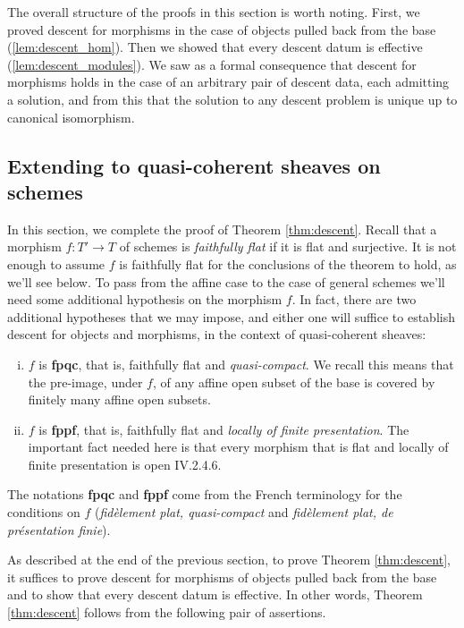 \documentclass[12pt]{article}
\begin{document}
\begin{remark}
    The overall structure of the proofs in this section is worth noting. First, we proved descent for morphisms in the case of objects pulled back from the base (\ref{lem:descent_hom}). Then we showed that
every descent datum is effective (\ref{lem:descent_modules}). We saw as a formal consequence that
descent for morphisms holds in the case of an arbitrary pair of descent data, each
admitting a solution, and from this that the solution to any descent problem is
unique up to canonical isomorphism.
\end{remark}

\subsection{Extending to quasi-coherent sheaves on schemes}
In this section, we complete the proof of Theorem \ref{thm:descent}. Recall that a morphism $f : T' \to T$ of schemes is \emph{faithfully flat} if it is flat and surjective. It is not enough to assume $f$ is faithfully flat for the conclusions of the theorem to hold, as we'll see below. To pass from the affine case to the case of general schemes we'll need some additional hypothesis on the morphism $f$. In fact, there are two additional hypotheses that we may impose, and either one will suffice to establish descent for objects and morphisms, in the context of quasi-coherent sheaves:

\begin{enumerate}[(i)]
\item $f$ is \textbf{fpqc}, that is, faithfully flat and \emph{quasi-compact}. 
We recall this means that the pre-image, under $f$, of any affine open subset of 
the base is covered by finitely many affine open subsets.

\item $f$ is \textbf{fppf}, that is, faithfully flat and \emph{locally of finite 
presentation}. The important fact needed here is that every morphism that is 
flat and locally of finite presentation is open \cite{EGA} IV.2.4.6.
\end{enumerate}

The notations \textbf{fpqc} and \textbf{fppf} come from the French terminology 
for the conditions on $f$ (\emph{fidèlement plat, quasi-compact} and 
\emph{fidèlement plat, de présentation finie}).

As described at the end of the previous section, to prove Theorem \ref{thm:descent}, it suffices to prove descent for morphisms of objects pulled back from the base and to show that every descent datum is effective. In other words, Theorem \ref{thm:descent} follows from the following pair of assertions.
\end{document}
